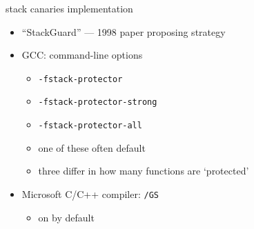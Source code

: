 
\begin{frame}{stack canaries implementation}
    \begin{itemize}
    \item ``StackGuard'' --- 1998 paper proposing strategy
    \item GCC: command-line options
        \begin{itemize}
        \item {\tt -fstack-protector} 
        \item {\tt -fstack-protector-strong} 
        \item {\tt -fstack-protector-all}
        \item one of these often default
        \item three differ in how many functions are `protected'
        \end{itemize}
    \item Microsoft C/C++ compiler: {\tt /GS}
        \begin{itemize}
        \item on by default
        \end{itemize}
    \end{itemize}
\end{frame}


